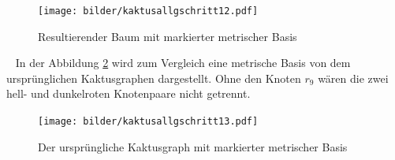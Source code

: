 \begin{bsp}
\vspace{-1mm}
  	   	 \begin{figure}[h!]
		\centering
 		 \texttt{[image: bilder/kaktusallgschritt12.pdf]}
   \caption{Resultierender Baum mit markierter metrischer Basis}
   \label{kaktus6}
  	 \end{figure}
  	 \vspace{-3mm}
  	 ~\linebreak 
  	 In der Abbildung \ref{kaktus7} wird zum Vergleich eine metrische Basis von dem ursprünglichen Kaktusgraphen dargestellt. Ohne den Knoten $r_9$ wären die zwei hell- und dunkelroten Knotenpaare nicht getrennt.
  	 \vspace{-1mm}
  	 \begin{figure}[h!]
		\centering
 		 \texttt{[image: bilder/kaktusallgschritt13.pdf]}
   \caption{Der ursprüngliche Kaktusgraph mit markierter metrischer Basis}
   \label{kaktus7}
  	 \end{figure}
  	 \end{bsp}
  	 \clearpage
